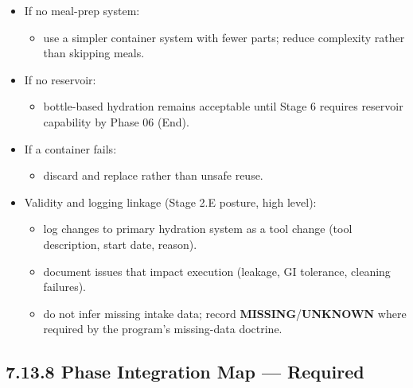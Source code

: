 \documentclass[10pt]{article}
\begin{document}
\begin{itemize}
\item If no meal-prep system:
  \begin{itemize}
  \item use a simpler container system with fewer parts; reduce complexity rather than skipping meals.
  \end{itemize}
\item If no reservoir:
  \begin{itemize}
  \item bottle-based hydration remains acceptable until Stage 6 requires reservoir capability by Phase 06 (End).
  \end{itemize}
\item If a container fails:
  \begin{itemize}
  \item discard and replace rather than unsafe reuse.
  \end{itemize}
\item Validity and logging linkage (Stage 2.E posture, high level):
  \begin{itemize}
  \item log changes to primary hydration system as a tool change (tool description, start date, reason).
  \item document issues that impact execution (leakage, GI tolerance, cleaning failures).
  \item do not infer missing intake data; record \textbf{MISSING}/\textbf{UNKNOWN} where required by the program’s missing-data doctrine.
  \end{itemize}
\end{itemize}

\subsection*{7.13.8 Phase Integration Map — Required}
{}

\begingroup
\scriptsize
\setlength{\tabcolsep}{2pt}
\renewcommand{\arraystretch}{1.12}
\end{document}
